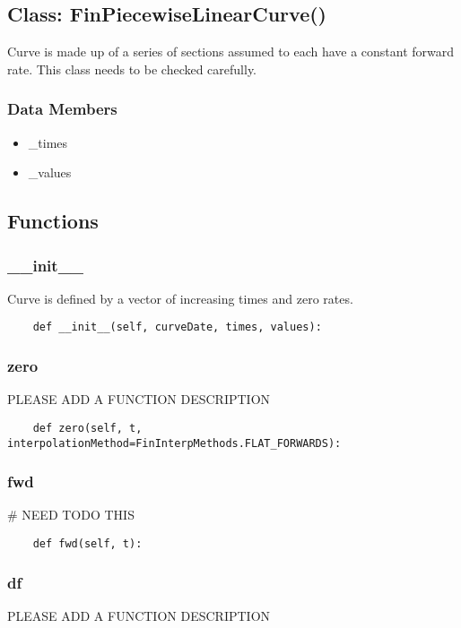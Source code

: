 \documentclass[twoside,11pt]{book}
\begin{document}
\subsection*{Class: FinPiecewiseLinearCurve()}
Curve is made up of a series of sections assumed to each have a constant forward rate. This class needs to be checked carefully.  

\subsubsection*{Data Members}
\begin{itemize}
\item{\_times}
\item{\_values}
\end{itemize}

\subsection*{Functions}

\subsubsection*{{\bf \_\_init\_\_}}
Curve is defined by a vector of increasing times and zero rates.  

\begin{lstlisting}
    def __init__(self, curveDate, times, values):
\end{lstlisting}

\subsubsection*{{\bf zero}}
PLEASE ADD A FUNCTION DESCRIPTION

\begin{lstlisting}
    def zero(self, t, interpolationMethod=FinInterpMethods.FLAT_FORWARDS):
\end{lstlisting}

\subsubsection*{{\bf fwd}}
\# NEED TODO THIS 

\begin{lstlisting}
    def fwd(self, t):
\end{lstlisting}

\subsubsection*{{\bf df}}
PLEASE ADD A FUNCTION DESCRIPTION
\end{document}
